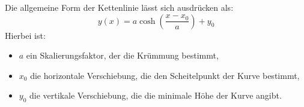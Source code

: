 Die allgemeine Form der Kettenlinie lässt sich ausdrücken als:
\begin{equation}
	y(x)
	=
	a \cosh\left(\frac{x - x_0}{a}\right) + y_0
\end{equation}
Hierbei ist:

\begin{itemize}
	\item \(a\) ein Skalierungsfaktor, der die Krümmung bestimmt,
	\item \(x_0\) die horizontale Verschiebung, die den Scheitelpunkt der Kurve bestimmt,
	\item \(y_0\) die vertikale Verschiebung, die die minimale Höhe der Kurve angibt.
\end{itemize}
